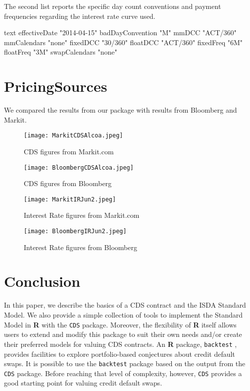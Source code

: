 \documentclass[a4paper]{article}
\renewenvironment{Schunk}{\vspace{\topsep}}{\vspace{\topsep}}
\begin{document}
The second list reports the specific day count conventions and payment
frequencies regarding the interest rate curve used. 

\begin{Schunk}
\begin{Soutput}
                 text        
effectiveDate    "2014-04-15"
badDayConvention "M"         
mmDCC            "ACT/360"   
mmCalendars      "none"      
fixedDCC         "30/360"    
floatDCC         "ACT/360"   
fixedFreq        "6M"        
floatFreq        "3M"        
swapCalendars    "none"      
\end{Soutput}
\end{Schunk}

\section{PricingSources}
\label{sec:PricingSources}

We compared the results from our package with results from Bloomberg and Markit.

\usepackage{graphicx}

\begin{figure}[ht!]
\centering
\texttt{[image: MarkitCDSAlcoa.jpeg]}
\caption{CDS figures from Markit.com}
\end{figure}

\begin{figure}[ht!]
\centering
\texttt{[image: BloombergCDSAlcoa.jpeg]}
\caption{CDS figures from Bloomberg}
\end{figure}

\begin{figure}[ht!]
\centering
\texttt{[image: MarkitIRJun2.jpeg]}
\caption{Interest Rate figures from Markit.com}
\end{figure}

\begin{figure}[ht!]
\centering
\texttt{[image: BloombergIRJun2.jpeg]}
\caption{Interest Rate figures from Bloomberg}
\end{figure}


\section{Conclusion}

In this paper, we describe the basics of a CDS contract and the ISDA
Standard Model. We also provide a simple collection
of tools to implement the Standard Model in \textbf{R} with the
\texttt{CDS} package. Moreover, the flexibility of \textbf{R} itself
allows users to extend and modify this package to suit their own
needs and/or create their preferred models for valuing CDS contracts. An
\textbf{R} package, \texttt{backtest} \cite{kane:david}, provides
facilities to explore portfolio-based conjectures about credit default
swaps. It is possible to use the \texttt{backtest} package based on
the output from the \texttt{CDS} package. Before reaching that level
of complexity, however, \texttt{CDS} provides a good starting point
for valuing credit default swaps.



\end{document}
